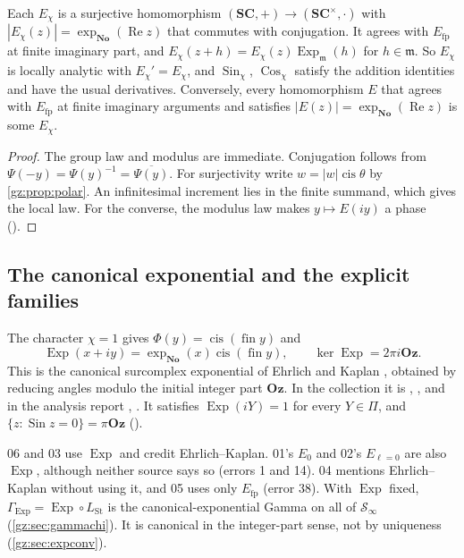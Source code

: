 \documentclass[11pt,a4paper]{article}
\numberwithin{equation}{section}
\theoremstyle{definition}
\theoremstyle{remark}
\newcommand{\No}{\mathbf{No}}
\newcommand{\SC}{\mathbf{SC}}
\newcommand{\Oz}{\mathbf{Oz}}
\newcommand{\mm}{\mathfrak m}
\renewcommand{\Re}{\operatorname{Re}}
\newcommand{\fin}{\operatorname{fin}}
\newcommand{\cis}{\operatorname{cis}}
\newcommand{\Exp}{\operatorname{Exp}}
\newcommand{\Ex}{\operatorname{Exp}_{\mm}}
\newcommand{\Efp}{E_{\mathrm{fp}}}
\newcommand{\Sin}{\operatorname{Sin}}
\newcommand{\Cos}{\operatorname{Cos}}
\newcommand{\LSt}{L_{\mathrm{St}}}
\newcommand{\Sinf}{\mathcal S_{\infty}}
\newcommand{\src}[1]{\textup{[#1]}}
\begin{document}
\begin{proposition}[Exponential calculus \src{01, 02, 03}]\label{gz:prop:Echi}
Each $E_\chi$ is a surjective homomorphism $(\SC,+)\to(\SC^\times,\cdot)$
with $|E_\chi(z)|=\exp_{\No}(\Re z)$ that commutes with conjugation. It
agrees with $\Efp$ at finite imaginary part, and $E_\chi(z+h)=E_\chi(z)\Ex(h)$
for $h\in\mm$. So $E_\chi$ is locally analytic with $E_\chi'=E_\chi$, and
$\Sin_\chi$, $\Cos_\chi$ satisfy the addition identities and have the
usual derivatives. Conversely, every homomorphism $E$ that agrees with
$\Efp$ at finite imaginary arguments and satisfies
$|E(z)|=\exp_{\No}(\Re z)$ is some $E_\chi$.
\end{proposition}
\begin{proof}
The group law and modulus are immediate. Conjugation follows from
$\Psi(-y)=\Psi(y)^{-1}=\overline{\Psi(y)}$. For surjectivity write
$w=|w|\cis\theta$ by \cref{gz:prop:polar}. An infinitesimal increment lies
in the finite summand, which gives the local law. For the converse, the
modulus law makes $y\mapsto E(iy)$ a phase
().
\end{proof}

\subsection{The canonical exponential and the explicit families}\label{gz:sec:canonical}
\begin{definition}\label{gz:def:Exp}
The character $\chi=1$ gives $\Phi(y)=\cis(\fin y)$ and
\[
\Exp(x+iy)=\exp_{\No}(x)\cis(\fin y),\qquad \ker\Exp=2\pi i\Oz .
\]
This is the canonical surcomplex exponential of Ehrlich and Kaplan
\cite[Theorem 11.1]{EK}, obtained by reducing angles modulo the initial
integer part $\Oz$. In the collection it is ,
, and in the analysis report
, . It satisfies $\Exp(iY)=1$ for
every $Y\in\Pi$, and $\{z:\Sin z=0\}=\pi\Oz$ ().
\end{definition}
06 and 03 use $\Exp$ and credit Ehrlich--Kaplan. 01's $E_0$ and 02's
$E_{\ell=0}$ are also $\Exp$, although neither source says so (errors 1 and
14). 04 mentions Ehrlich--Kaplan without using it, and 05 uses only $\Efp$
(error 38). With $\Exp$ fixed, $\Gamma_{\Exp}=\Exp\circ\LSt$ is the
canonical-exponential Gamma on all of $\Sinf$ (\cref{gz:sec:gammachi}). It
is canonical in the integer-part sense, not by uniqueness
(\cref{gz:sec:expconv}).
\end{document}
